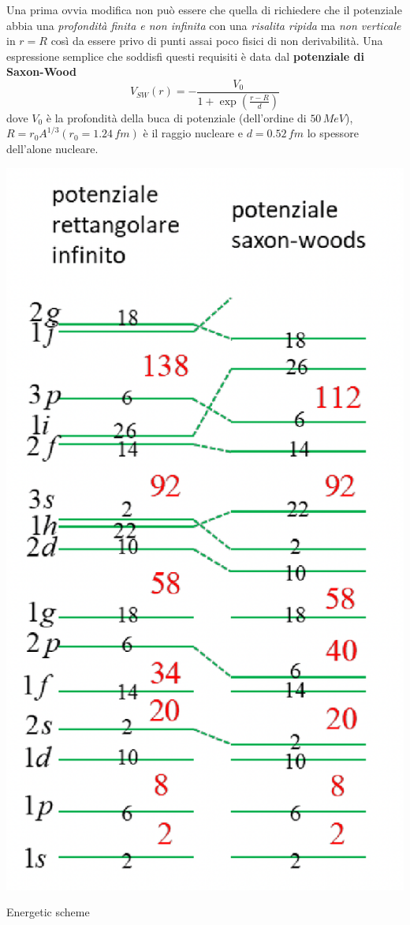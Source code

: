 Una prima ovvia modifica non può essere che quella di richiedere che il potenziale abbia una \emph{profondità finita e non infinita} con una \emph{risalita ripida} ma \emph{non verticale} in $r=R$ così da essere privo di punti assai poco fisici di non derivabilità. Una espressione semplice che soddisfi questi requisiti è data dal \textbf{potenziale di Saxon-Wood}
\[
V_{SW}(r) = -\frac{V_{0}}{1 + \exp{\left( \frac{r-R}{d} \right)}}
\]
dove $V_{0}$ è la profondità della buca di potenziale (dell’ordine di $50 \, MeV$), $R=r_{0}A^{1/3} (r_{0} = 1.24 \, fm)$ è il raggio nucleare e $d = 0.52 \, fm$ lo spessore dell’alone nucleare.
\begin{marginfigure}
	\includegraphics{figs/energetic-levels-sw}
	\caption{Energetic scheme }
	\label{fig:energetic-levels-sw}
\end{marginfigure}
